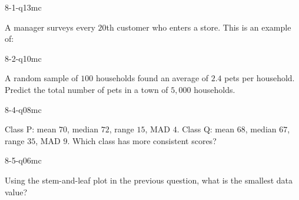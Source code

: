 \begin{practiceQuestion}{8-1-q13}{mc}
\begin{questionText}
A manager surveys every $20$th customer who enters a store. This is an example of:
\end{questionText}
\end{practiceQuestion}

\begin{practiceQuestion}{8-2-q10}{mc}
\begin{questionText}
A random sample of $100$ households found an average of $2.4$ pets per household. Predict the total number of pets in a town of $5{,}000$ households.
\end{questionText}
\end{practiceQuestion}

\begin{practiceQuestion}{8-4-q08}{mc}
\begin{questionText}
Class P: mean $70$, median $72$, range $15$, MAD $4$.
Class Q: mean $68$, median $67$, range $35$, MAD $9$.
Which class has more consistent scores?
\end{questionText}
\end{practiceQuestion}

\begin{practiceQuestion}{8-5-q06}{mc}
\begin{questionText}
Using the stem-and-leaf plot in the previous question, what is the smallest data value?
\end{questionText}
\end{practiceQuestion}

